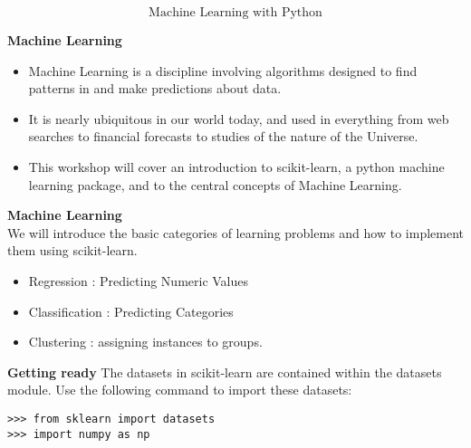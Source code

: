 \documentclass[MASTER.tex]{subfiles}
\begin{document}
 
	
	
	\begin{frame}
		\huge
		\[ \mbox{Machine Learning with Python} \]
	\end{frame}
	
\begin{frame}
\Large
\textbf{Machine Learning}
\begin{itemize}
\item Machine Learning is a discipline involving algorithms designed to find patterns in and make predictions about data. 
\item It is nearly ubiquitous in our world today, and used in everything from web searches to financial forecasts to studies of the nature of the Universe. \item This workshop will cover an introduction to scikit-learn, a python machine learning package, and to the central concepts of Machine Learning. 
\end{itemize}


\end{frame}
\begin{frame}
\Large	\textbf{Machine Learning}\\
	We will introduce the basic categories of learning problems and how to implement them using scikit-learn. 

\begin{itemize}
	\item Regression : Predicting Numeric Values
	\item Classification :  Predicting Categories
	\item Clustering : assigning instances to groups.
\end{itemize}
\end{frame}
\begin{frame}[fragile]
\textbf{Getting ready}
The datasets in scikit-learn are contained within the datasets module. Use the following
command to import these datasets:
\begin{framed}
\begin{verbatim}
>>> from sklearn import datasets
>>> import numpy as np
\end{verbatim}
\end{framed}

\end{frame}
\end{document}
